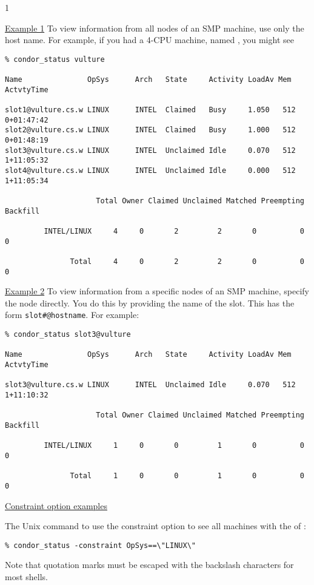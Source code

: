 \begin{ManPage}{\label{man-condor-status}}{1}
\begin{itemize}
\end{itemize}

\Examples

\underline{Example 1} To view information from all nodes of an SMP
machine, use only the host name.
For example, if you had a 4-CPU machine, named
, you might see
\footnotesize
\begin{verbatim}
% condor_status vulture

Name               OpSys      Arch   State     Activity LoadAv Mem   ActvtyTime

slot1@vulture.cs.w LINUX      INTEL  Claimed   Busy     1.050   512  0+01:47:42
slot2@vulture.cs.w LINUX      INTEL  Claimed   Busy     1.000   512  0+01:48:19
slot3@vulture.cs.w LINUX      INTEL  Unclaimed Idle     0.070   512  1+11:05:32
slot4@vulture.cs.w LINUX      INTEL  Unclaimed Idle     0.000   512  1+11:05:34

                     Total Owner Claimed Unclaimed Matched Preempting Backfill

         INTEL/LINUX     4     0       2         2       0          0        0

               Total     4     0       2         2       0          0        0
\end{verbatim}
\normalsize


\underline{Example 2} To view information from a specific nodes of an
SMP machine, specify the node directly.
You do this by providing the name of the slot.
This has the form \texttt{slot\#@hostname}.
For example:
\footnotesize
\begin{verbatim}
% condor_status slot3@vulture

Name               OpSys      Arch   State     Activity LoadAv Mem   ActvtyTime

slot3@vulture.cs.w LINUX      INTEL  Unclaimed Idle     0.070   512  1+11:10:32

                     Total Owner Claimed Unclaimed Matched Preempting Backfill

         INTEL/LINUX     1     0       0         1       0          0        0

               Total     1     0       0         1       0          0        0
\end{verbatim}
\normalsize

\underline{Constraint option examples}

The Unix command
to use the constraint option to see all machines with the 
of :
\begin{verbatim}
% condor_status -constraint OpSys==\"LINUX\"
\end{verbatim}
Note that quotation marks must be escaped with the backslash characters
for most shells.


\end{ManPage}
